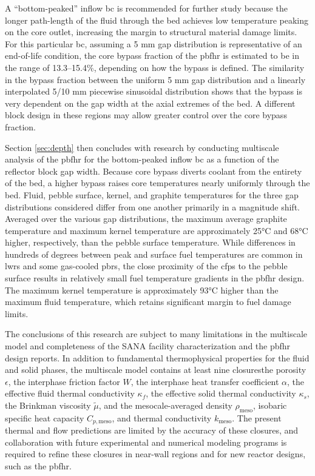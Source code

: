 A ``bottom-peaked'' inflow \gls{bc} is recommended for further study because the longer path-length of the fluid through the bed achieves low temperature peaking on the core outlet, increasing the margin to structural material damage limits. For this particular \gls{bc}, assuming a 5 \si{\milli\meter} gap distribution is representative of an end-of-life condition, the core bypass fraction of the \gls{pbfhr} is estimated to be in the range of 13.3--15.4\%, depending on how the bypass is defined. The similarity in the bypass fraction between the uniform 5 \si{\milli\meter} gap distribution and a linearly interpolated 5/10
 \si{\milli\meter} piecewise sinusoidal distribution shows that the bypass is very dependent on the gap width at the axial extremes of the bed. A different block design in these regions may allow greater control over the core bypass fraction.

Section \ref{sec:depth} then concludes with research by conducting multiscale analysis of the \gls{pbfhr} for the bottom-peaked inflow \gls{bc} as a function of the reflector block gap width. Because core bypass diverts coolant from the entirety of the bed, a higher bypass raises core temperatures nearly uniformly through the bed. Fluid, pebble surface, kernel, and graphite temperatures for the three gap distributions considered differ from one another primarily in a magnitude shift. Averaged over the various gap distributions, the maximum average graphite temperature and maximum kernel temperature are approximately 25\si{\celsius} and 68\si{\celsius} higher, respectively, than the pebble surface temperature. While differences in hundreds of degrees between peak and surface fuel temperatures are common in \glspl{lwr} and some gas-cooled \glspl{pbr}, the close proximity of the \glspl{cfp} to the pebble surface results in relatively small fuel temperature gradients in the \gls{pbfhr} design. The maximum kernel temperature is approximately 93\si{\celsius} higher than the maximum fluid temperature, which retains significant margin to fuel damage limits.

The conclusions of this research are subject to many limitations in the multiscale model and completeness of the SANA facility characterization and the \gls{pbfhr} design reports. In addition to fundamental thermophysical properties for the fluid and solid phases, the multiscale model contains at least nine closures\mdash the porosity \(\epsilon\), the interphase friction factor \(W\), the interphase heat transfer coefficient \(\alpha\), the effective fluid thermal conductivity \(\kappa_f\), the effective solid thermal conductivity \(\kappa_s\), the Brinkman viscosity \(\tilde{\mu}\), and the mesocale-averaged density \(\rho_\text{meso}\), isobaric specific heat capacity \(C_{p,\text{meso}}\), and thermal conductivity \(k_\text{meso}\). The present thermal and flow predictions are limited by the accuracy of these closures, and collaboration with future experimental and numerical modeling programs is required to refine these closures in near-wall regions and for new reactor designs, such as the \gls{pbfhr}. 

